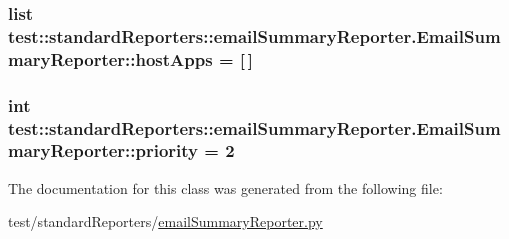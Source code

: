 \hypertarget{classtest_1_1standardReporters_1_1emailSummaryReporter_1_1EmailSummaryReporter_a681d3a9343df01f5bf19cbdfb4d33a61}{
\subsubsection[{host\-Apps}]{\setlength{\rightskip}{0pt plus 5cm}list {\bf test\-::standard\-Reporters\-::email\-Summary\-Reporter.\-Email\-Summary\-Reporter\-::host\-Apps} = \mbox{[}$\,$\mbox{]}}}\label{db/db5/classtest_1_1standardReporters_1_1emailSummaryReporter_1_1EmailSummaryReporter_a681d3a9343df01f5bf19cbdfb4d33a61}
\hypertarget{classtest_1_1standardReporters_1_1emailSummaryReporter_1_1EmailSummaryReporter_a5365747d8ef7f3c9a64ecb10cd7f4d16}{
\subsubsection[{priority}]{\setlength{\rightskip}{0pt plus 5cm}int {\bf test\-::standard\-Reporters\-::email\-Summary\-Reporter.\-Email\-Summary\-Reporter\-::priority} = 2}}\label{db/db5/classtest_1_1standardReporters_1_1emailSummaryReporter_1_1EmailSummaryReporter_a5365747d8ef7f3c9a64ecb10cd7f4d16}


\-The documentation for this class was generated from the following file\-:\begin{DoxyCompactItemize}
\item 
test/standard\-Reporters/\hyperlink{emailSummaryReporter_8py}{email\-Summary\-Reporter.\-py}\end{DoxyCompactItemize}
